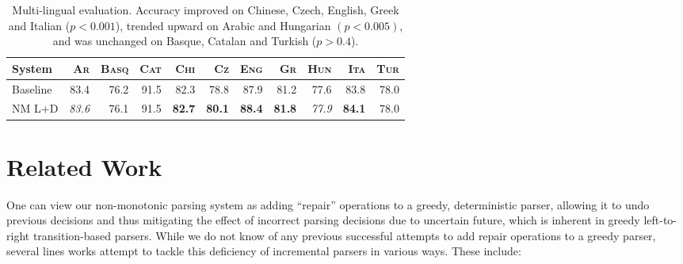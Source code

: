 \documentclass[11pt,letterpaper]{article}
\begin{document}
\begin{table*}
    \centering
    \small
    \begin{tabular}{l|rrrrrrrrrr}
        \hline
        System & \textsc{Ar} & \textsc{Basq} & \textsc{Cat} & \textsc{Chi} & \textsc{Cz} & \textsc{Eng} & \textsc{Gr} & \textsc{Hun} & \textsc{Ita} & \textsc{Tur} \\
        \hline \hline
      Baseline & 83.4 & 76.2 & 91.5 & 82.3  & 78.8  & 87.9 & 81.2 & 77.6 & 83.8 & 78.0 \\
        NM L+D & \emph{83.6} & 76.1 & 91.5 & \textbf{82.7} & \textbf{80.1} & \textbf{88.4} & \textbf{81.8} & \emph{77.9} & \textbf{84.1} & 78.0 \\
    \end{tabular}
    \caption{\small
        Multi-lingual evaluation. Accuracy improved
        on Chinese, Czech, English, Greek and Italian ($p < 0.001$), trended
        upward on Arabic and Hungarian $(p < 0.005)$, and was unchanged on
        Basque, Catalan and Turkish ($p > 0.4$).
    \label{tab:conll}}
\vspace{-0.7\baselineskip}
\end{table*}

\section{Related Work}

One can view our non-monotonic parsing system as adding ``repair'' operations to a greedy, deterministic parser, allowing it to undo previous decisions and thus mitigating the effect of incorrect parsing decisions due to uncertain future, which is inherent in greedy left-to-right transition-based parsers. 
While we do not know of any previous successful attempts to add repair operations to a greedy parser, several lines works attempt to tackle this deficiency of incremental parsers in various ways. These include:
\end{document}
